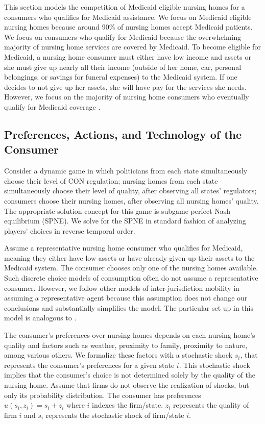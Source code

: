 \documentclass[../Main.tex]{subfiles}
\begin{document}
This section models the competition of Medicaid eligible nursing homes for a consumers who qualifies for Medicaid assistance. We focus on Medicaid eligible nursing homes because around 90\% of nursing homes accept Medicaid patients. We focus on consumers who qualify for Medicaid because the overwhelming majority of nursing home services are covered by Medicaid. To become eligible for Medicaid, a nursing home consumer must either have low income and assets or she must give up nearly all their income (outside of her home, car, personal belongings, or savings for funeral expenses) to the Medicaid system. If one decides to not give up her assets, she will have pay for the services she needs. However, we focus on the majority of nursing home consumers who eventually qualify for Medicaid coverage .  

\subsection{Preferences, Actions, and Technology of the Consumer}
Consider a dynamic game in which politicians from each state simultaneously choose their level of CON regulation; nursing homes from each state simultaneously choose their level of quality, after observing all states' regulators; consumers choose their nursing homes, after observing all nursing homes' quality. The appropriate solution concept for this game is subgame perfect Nash equilibrium (SPNE). We solve for the SPNE in standard fashion of analyzing players' choices in reverse temporal order. 

Assume a representative nursing home consumer who qualifies for Medicaid, meaning they either have low assets or have already given up their assets to the Medicaid system. The consumer chooses only one of the nursing homes available. Such discrete choice models of consumption often do not assume a representative consumer. However, we follow other models of inter-jurisdiction mobility in assuming a representative agent because this assumption does not change our conclusions and substantially simplifies the model. The particular set up in this model is analogous to \citet{basinger2004remodeling}.

The consumer's preferences over nursing homes depends on each nursing home's quality and factors such as weather, proximity to family, proximity to nature, among various others. We formalize these factors with a stochastic shock $s_i$, that represents the consumer's preferences for a given state $i$. This stochastic shock implies that the consumer's choice is not determined solely by the quality of the nursing home. Assume that firms do not observe the realization of shocks, but only its probability distribution. The consumer has preferences $u(s_i,z_i) = s_i + z_i$ where $i$ indexes the firm/state. $z_i$ represents the quality of firm $i$ and $s_i$ represents the stochastic shock of firm/state $i$. 
\end{document}
